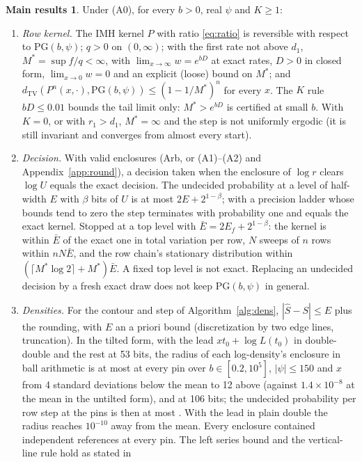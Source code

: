 \documentclass[11pt]{article}
\theoremstyle{definition}
\newtheorem*{mainthm}{Main results}
\newcommand{\PG}{\mathrm{PG}}
\newcommand{\TV}{d_{\mathrm{TV}}}
\begin{document}
\begin{mainthm}
Under (A0), for every $b>0$, real $\psi$ and $K\ge1$:
\begin{enumerate}[label=\textbf{T\arabic*.},leftmargin=2.2em]
\item \emph{Row kernel.} The IMH kernel $P$ with ratio \eqref{eq:ratio} is reversible with respect to
$\PG(b,\psi)$; $q>0$ on $(0,\infty)$; with the first rate not above $d_1$, $M^*=\sup f/q<\infty$, with
$\lim_{x\to\infty}w=e^{bD}$ at exact rates, $D>0$ in closed form, $\lim_{x\to0}w=0$ and an explicit (loose) bound on $M^*$; and
$\TV(P^n(x,\cdot),\PG(b,\psi))\le(1-1/M^*)^n$ for every $x$. The $K$ rule $bD\le0.01$ bounds the tail limit only:
$M^*>e^{bD}$ is certified at small $b$. With $K=0$, or with $r_1>d_1$, $M^*=\infty$ and the step is not
uniformly ergodic (it is still invariant and converges from almost every start).
\item \emph{Decision.} With valid enclosures (Arb, or (A1)--(A2) and Appendix~\ref{app:round}), a decision taken
when the enclosure of $\log r$ clears $\log U$ equals the exact decision. The undecided probability at a level of
half-width $E$ with $\beta$ bits of $U$ is at most $2E+2^{1-\beta}$; with a precision ladder whose bounds tend to
zero the step terminates with probability one and equals the exact kernel. Stopped at a top level with
$\bar E=2E_f+2^{1-\beta}$: the kernel is within $\bar E$ of the exact one in total variation per row, $N$ sweeps of
$n$ rows within $nN\bar E$, and the row chain's stationary distribution within $(\lceil M^*\log2\rceil+M^*)\bar E$.
A fixed top level is not exact. Replacing an undecided decision by a fresh exact draw does not keep $\PG(b,\psi)$
in general.
\item \emph{Densities.} For the contour and step of Algorithm~\ref{alg:dens}, $|\hat S-S|\le E$ plus the rounding,
with $E$ an a priori bound (discretization by two edge lines, truncation). In the tilted form, with the lead
$xt_0+\log L(t_0)$ in double-double and the rest at 53 bits, the radius of each log-density's enclosure in ball
arithmetic is at most \FLOORDENS{} at every pin over $b\in[0.2,10^5]$, $|\psi|\le150$ and $x$ from 4 standard
deviations below the mean to 12 above (against $1.4\times10^{-8}$ at the mean in the untilted form), and \FLOORHI{}
at 106 bits; the undecided probability per row step at the pins is then at most \FLOORSTEP. With the lead in plain
double the radius reaches $10^{-10}$ away from the mean. Every enclosure contained independent references at
every pin. The left series bound and the vertical-line rule hold as stated in

\end{enumerate}
\end{mainthm}
\end{document}
